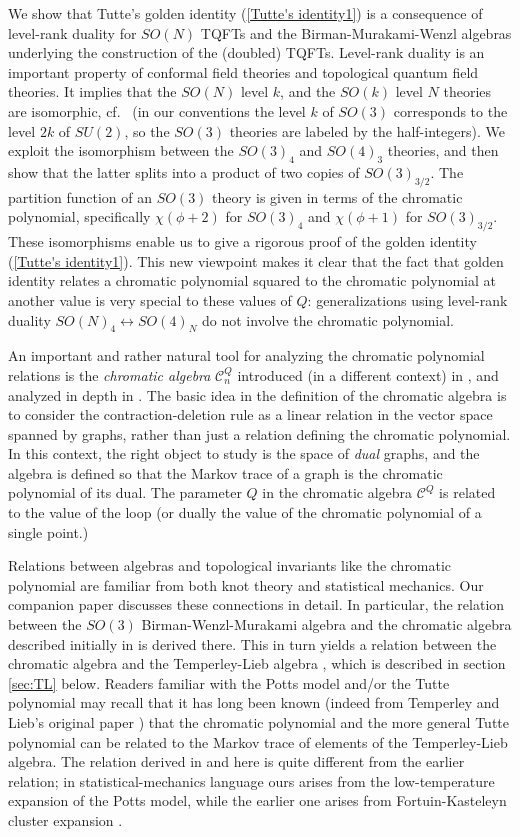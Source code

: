 \documentclass[11pt]{amsart}
\numberwithin{equation}{section}
\theoremstyle{definition}
\begin{document}
We show that Tutte's golden identity (\ref{Tutte's identity1}) is a
consequence of level-rank duality for $SO(N)$ TQFTs and the
Birman-Murakami-Wenzl algebras underlying the construction of the
(doubled) TQFTs.  Level-rank duality is an important property of
conformal field theories and topological quantum field theories. It
implies that the $SO(N)$ level $k$, and the $SO(k)$ level $N$ theories
are isomorphic, cf.\ \cite{MNRS} (in our conventions the level $k$ of
$SO(3)$ corresponds to the level $2k$ of $SU(2)$, so the $SO(3)$
theories are labeled by the half-integers). We exploit the isomorphism
between the $SO(3)_4$ and $SO(4)_3$ theories, and then show that the
latter splits into a product of two copies of $SO(3)_{3/2}$. The
partition function of an $SO(3)$ theory is given in terms of the
chromatic polynomial, specifically ${\chi}({\phi}+2)$ for $SO(3)_4$
and ${\chi}({\phi}+1)$ for $SO(3)_{3/2}$. These
isomorphisms enable us to give a rigorous proof
of the golden identity (\ref{Tutte's identity1}). This new viewpoint
makes it clear that the fact that golden identity relates a chromatic
polynomial squared to the chromatic polynomial at another value is
very special to these values of $Q$: generalizations using level-rank
duality $SO(N)_4\leftrightarrow SO(4)_N$ do not involve the chromatic
polynomial.

An important and rather natural tool for analyzing the chromatic
polynomial relations is the {\em chromatic algebra} ${\mathcal C}^Q_n$
introduced (in a different context) in \cite{Martin}, and analyzed in
depth in \cite{FK}.  The basic idea in the definition of the chromatic
algebra is to consider the contraction-deletion rule as a linear
relation in the vector space spanned by graphs, rather than just a
relation defining the chromatic polynomial. In this context, the right
object to study is the space of {\em dual} graphs, and the algebra is
defined so that the Markov trace of a graph is the chromatic
polynomial of its dual.  The parameter $Q$ in the chromatic algebra
${\mathcal C}^Q$ is related to the value of the loop (or dually the
value of the chromatic polynomial of a single point.)

Relations between algebras and topological invariants like the
chromatic polynomial are familiar from both knot theory and
statistical mechanics. Our companion paper \cite{FK} discusses
these connections in detail. In particular, the relation
between the $SO(3)$ Birman-Wenzl-Murakami algebra and the chromatic
algebra described initially in \cite{FR} is derived there. This in
turn yields a relation between the chromatic algebra and the
Temperley-Lieb algebra \cite{FR}, which is described in section
\ref{sec:TL} below. Readers familiar with the Potts model and/or the Tutte
polynomial may recall that it has long been known (indeed from
Temperley and Lieb's original paper \cite{TL}) that the chromatic
polynomial and the more general Tutte polynomial can be related to the
Markov trace of elements of the Temperley-Lieb algebra. The relation
derived in \cite{FR} and here is quite different from the earlier
relation; in statistical-mechanics language ours arises from the
low-temperature expansion of the Potts model, while the earlier one
arises from Fortuin-Kasteleyn cluster expansion \cite{FK}.
\end{document}
